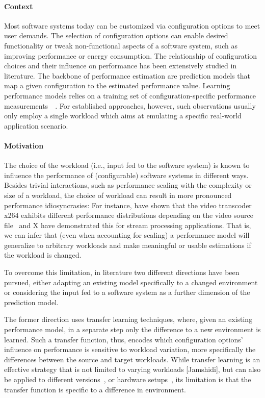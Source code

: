 
\paragraph{Context}
Most software systems today can be customized via configuration options to meet user demands. The selection of configuration options can enable desired functionality or tweak non-functional aspects of a software system, such as improving performance or energy consumption. The relationship of configuration choices and their influence on performance has been extensively studied in literature. The backbone of performance estimation are prediction models that map a given configuration to the estimated performance value. Learning performance models relies on a training set of configuration-specific performance measurements~~\cite{dorn2020,siegmundPerformanceinfluenceModelsHighly2015,haDeepPerf2019,perfAL,guoVariabilityawarePerformancePrediction2013,sarkarCostEfficientSamplingPerformance,guo_2018_data,fourier_learning_2015,perLasso}. For established approaches, however, such observations usually only employ a single workload which aims at emulating a specific real-world application scenario.

\paragraph{Motivation}
The choice of the workload (i.e., input fed to the software system) is known to influence the performance of (configurable) software systems in different ways. Besides trivial interactions, such as performance scaling with the complexity or size of a workload, the choice of workload can result in more pronounced performance idiosyncrasies: For instance, \citeauthor{alves_sampling_2020} have shown that the video transcoder x264 exhibits different performance distributions depending on the video source file~\cite{alves_sampling_2020} and X have demonstrated this for stream processing applications. That is, we can infer that (even when accounting for scaling) a performance model will generalize to arbitrary workloads and make meaningful or usable estimations if the workload is changed. 

To overcome this limitation, in literature two different directions have been pursued, either adapting an existing model specifically  to a changed environment or considering the input fed to a software system as a further dimension of the prediction model. 

The former direction uses transfer learning techniques, where, given an existing performance model, in a separate step only the difference to a new environment is learned. Such a transfer function, thus, encodes which configuration options’ influence on performance is sensitive to workload variation, more specifically the differences between the source and target workloads. While transfer learning is an effective strategy that is not limited to varying workloads [Jamshidi], but can also be applied to different versions~\cite{martin_transfer_2021}, or hardware setups~\cite{}, its  limitation is that the transfer function is specific to a difference in environment.

